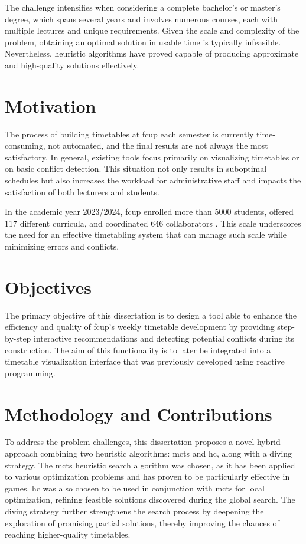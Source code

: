 The challenge intensifies when considering a complete bachelor’s or master’s degree, which spans several years and involves numerous courses, each with multiple lectures and unique requirements. Given the scale and complexity of the problem, obtaining an optimal solution in usable time is typically infeasible. Nevertheless, heuristic algorithms have proved capable of producing approximate and high-quality solutions effectively. 

\section{Motivation}

The process of building timetables at \ac{fcup} each semester is currently time-consuming, not automated, and the final results are not always the most satisfactory. In general, existing tools focus primarily on visualizing timetables or on basic conflict detection. This situation not only results in suboptimal schedules but also increases the workload for administrative staff and impacts the satisfaction of both lecturers and students. 

In the academic year 2023/2024, \ac{fcup} enrolled more than 5000 students, offered 117 different curricula, and coordinated 646 collaborators \cite{fcup_em_numeros}. This scale underscores the need for an effective timetabling system that can manage such scale while minimizing errors and conflicts. %

\section{Objectives}

The primary objective of this dissertation is to design a tool able to enhance the efficiency and quality of \ac{fcup}'s weekly timetable development by providing step-by-step interactive recommendations and detecting potential conflicts during its construction. The aim of this functionality is to later be integrated into a timetable visualization interface that was previously developed using reactive programming.

\section{Methodology and Contributions}

To address the problem challenges, this dissertation proposes a novel hybrid approach combining two heuristic algorithms: \ac{mcts} and \ac{hc}, along with a diving strategy. The \ac{mcts} heuristic search algorithm was chosen, as it has been applied to various optimization problems and has proven to be particularly effective in games. \ac{hc} was also chosen to be used in conjunction with \ac{mcts} for local optimization, refining feasible solutions discovered during the global search. The diving strategy further strengthens the search process by deepening the exploration of promising partial solutions, thereby improving the chances of reaching higher-quality timetables.

